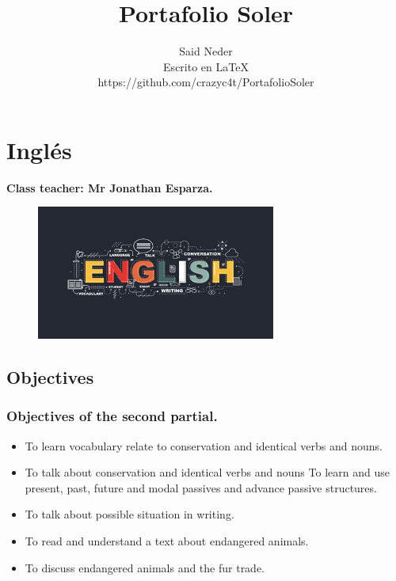 \documentclass[a4paper, 12pt]{article}
\title{Portafolio Soler}
\author{Said Neder\\Escrito en \LaTeX\\https://github.com/crazyc4t/PortafolioSoler}
\begin{document}
\maketitle
\tableofcontents

\section{Inglés}
\textbf{Class teacher: Mr Jonathan Esparza.}

\begin{figure}[h]
  \includegraphics[width=0.7\textwidth, center]{english.jpeg}
\end{figure}

\subsection{Objectives}

\subsubsection{Objectives of the second partial.}
\begin{itemize}
  \item To learn vocabulary relate to conservation and identical verbs and nouns.
  \item To talk about conservation and identical verbs and nouns
    To learn and use present, past, future and modal passives and advance passive structures.
  \item To talk about possible situation in writing.
  \item To read and understand a text about endangered animals.
  \item To discuss endangered animals and the fur trade.
\end{itemize}
\end{document}
